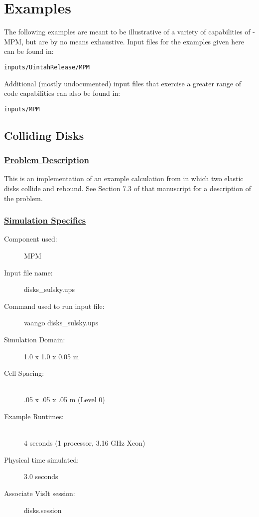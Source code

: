 %
\section{Examples} \label{Sec:ExamplesMPM}

The following examples are meant to be illustrative of a variety of
capabilities of \Vaango-MPM, but are by no means exhaustive.  Input files
for the examples given here can be found in:
\begin{lstlisting}[backgroundcolor=\color{background}]
inputs/UintahRelease/MPM
\end{lstlisting}

Additional (mostly undocumented) input files that exercise a greater range
of code capabilities can also be found in:
\begin{lstlisting}[backgroundcolor=\color{background}]
inputs/MPM
\end{lstlisting}

\newpage
\subsection*{\center Colliding Disks}
\subsubsection*{\underline{Problem Description}}
This is an implementation of an example calculation from \cite{Sulsky1994} in
which two elastic disks collide and rebound.  See Section 7.3 of that
manuscript for a description of the problem.
 
\subsubsection*{\underline{Simulation Specifics}}
\begin{description} 
\item [Component used:] \hfill MPM
\item [Input file name:] \hfill disks\_sulsky.ups
\item [Command used to run input file:]\hfill vaango disks\_sulsky.ups
\item [Simulation Domain:]\hfill    1.0 x 1.0 x 0.05 m

\item [Cell Spacing:]\hfill \\ 
.05 x .05 x .05 m (Level 0)

\item [Example Runtimes:] \hfill \\
 4 seconds  (1 processor, 3.16 GHz Xeon)\\

\item [Physical time simulated:] \hfill 3.0 seconds

\item [Associate VisIt session:] \hfill disks.session

\end{description}

